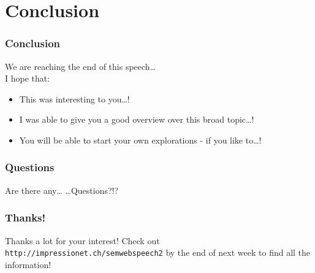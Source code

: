 \documentclass{beamer}
\begin{document}
    \section{Conclusion}

       \begin{frame}
           \frametitle{Conclusion}

           We are reaching the end of this speech\ldots\\
           I hope that:
           \vskip 0.7cm
           \pause
           \begin{itemize}
               \item This was interesting to you\ldots!
               \pause
               \item I was able to give you a good overview over this broad topic\ldots!
               \pause
               \item You will be able to start your own explorations - if you like to\ldots!
           \end{itemize}


       \end{frame}

       \begin{frame}
           \frametitle{Questions}

           Are there any\ldots
           \vskip 0.7cm
           \huge
           \ldots Questions?!?
           \normalsize

       \end{frame}

       \begin{frame}
           \frametitle{Thanks!}
           \vskip 0.7cm
           \huge
           Thanks a lot for your interest!
           \normalsize
           \vskip 0.7cm
           Check out 
           \vskip 0.5cm
           \texttt{http://impressionet.ch/semwebspeech2}
           \vskip 0.5cm
           by the end of next week to find all the information!
       \end{frame}
\end{document}
